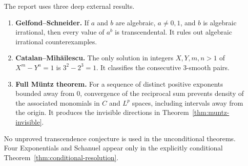 \documentclass[11pt,oneside]{article}
\theoremstyle{definition}
\theoremstyle{remark}
\begin{document}
The report uses three deep external results.

\begin{enumerate}
\item \textbf{Gelfond--Schneider.}  If $a$ and $b$ are algebraic, $a\ne0,1$, and $b$ is
      algebraic irrational, then every value of $a^b$ is transcendental.  It rules out
      algebraic irrational counterexamples.
\item \textbf{Catalan--Mih\u{a}ilescu.}  The only solution in integers $X,Y,m,n>1$ of
      $X^m-Y^n=1$ is $3^2-2^3=1$.  It classifies the consecutive $3$-smooth pairs.
\item \textbf{Full M\"untz theorem.}  For a sequence of distinct positive exponents bounded
      away from $0$, convergence of the reciprocal sum prevents density of the associated
      monomials in $C$ and $L^p$ spaces, including intervals away from the origin.  It produces
      the invisible directions in Theorem~\ref{thm:muntz-invisible}.
\end{enumerate}

No unproved transcendence conjecture is used in the unconditional theorems.  Four Exponentials
and Schanuel appear only in the explicitly conditional Theorem~\ref{thm:conditional-resolution}.
\end{document}

